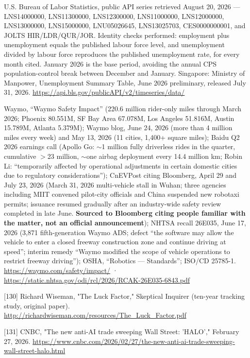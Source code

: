 \documentclass[11pt,a4paper]{article}
\begin{document}
\noindent [128] U.S. Bureau of Labor Statistics, public API series retrieved August 20, 2026 --- LNS14000000, LNS11300000, LNS12300000, LNS11000000, LNS12000000, LNS13000000, LNS15000000, LNU05026645, LNS13025703, CES0000000001, and JOLTS HIR/LDR/QUR/JOR. Identity checks performed: employment plus unemployment equals the published labour force level, and unemployment divided by labour force reproduces the published unemployment rate, for every month cited. January 2026 is the base period, avoiding the annual CPS population-control break between December and January. Singapore: Ministry of Manpower, Unemployment Summary Table, June 2026 preliminary, released July 31, 2026. \url{https://api.bls.gov/publicAPI/v2/timeseries/data/}

\noindent [129] Waymo, ``Waymo Safety Impact'' (220.6 million rider-only miles through March 2026; Phoenix 80.551M, SF Bay Area 67.078M, Los Angeles 51.816M, Austin 15.789M, Atlanta 5.379M); Waymo blog, June 24, 2026 (more than 4 million miles every week) and May 13, 2026 (11 cities, 1,400+ square miles); Baidu Q2 2026 earnings call (Apollo Go: $\sim$1 million fully driverless rides in the quarter, cumulative $>$23 million, $\sim$one airbag deployment every 14.4 million km; Robin Li: ``temporarily affected by operational adjustments in certain domestic cities due to regulatory considerations''); CnEVPost citing Bloomberg, April 29 and July 23, 2026 (March 31, 2026 multi-vehicle stall in Wuhan; three agencies including MIIT convened pilot-city officials and China suspended new robotaxi permits; issuance resumed gradually after an industry-wide safety review completed in late June. \textbf{Sourced to Bloomberg citing people familiar with the matter, not an official announcement}); NHTSA recall 26E035, June 17, 2026 (3,871 fifth-generation Waymo ADS; defect ``the software may allow the vehicle to enter a closed freeway construction zone and continue driving at speed''; interim remedy ``Waymo modified the scope of vehicle operations to restrict freeway driving''); OSHA, ``Robotics --- Standards''; ISO/CD 25785-1. \url{https://waymo.com/safety/impact/} · \url{https://static.nhtsa.gov/odi/rcl/2026/RCAK-26E035-6843.pdf}

\normalsize

[130] Richard Wiseman, "The Luck Factor," Skeptical Inquirer (ten-year tracking study, original paper). \url{http://richardwiseman.com/resources/The\_Luck\_Factor.pdf}

[131] CNBC, "The new anti-AI trade sweeping Wall Street: 'HALO'," February 27, 2026. \url{https://www.cnbc.com/2026/02/27/the-new-anti-ai-trade-sweeping-wall-street-halo.html}
\end{document}
